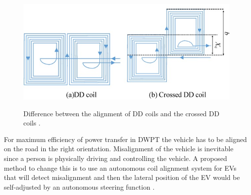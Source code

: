 \begin{figure}
    \begin{center}
    \includegraphics[width=5in]{fig4.jpg}
    \end{center}
    \renewcommand{\baselinestretch}{1}
    \small\normalsize
    \begin{quote}
    \caption[Difference between the alignment of DD coils and the crossed DD coils]{Difference between the alignment of DD coils and the crossed DD coils \cite{xiang_design_2017}.} \label{fig: f4}
    \end{quote}
\end{figure}

For maximum efficiency of power transfer in DWPT the vehicle has to be aligned on the road in the right orientation. 
Misalignment of the vehicle is inevitable since a person is physically driving and controlling the vehicle. 
A proposed method to change this is to use an autonomous coil alignment system for EVs that will detect misalignment 
and then the lateral position of the EV would be self-adjusted by an autonomous steering function 
\cite{karam_hwang_autonomous_2017}. 

